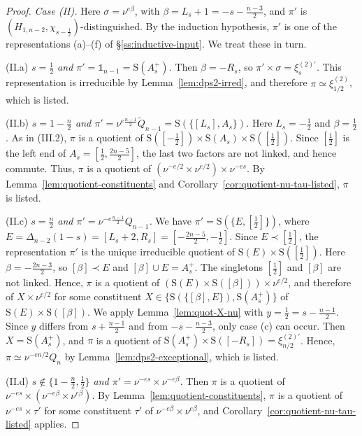\documentclass[11pt]{amsart}
\numberwithin{equation}{section}
\theoremstyle{plain}
\theoremstyle{definition}
\theoremstyle{remark}
\newcommand{\one}{\mathds{1}}
\newcommand{\Qt}{\widetilde{Q}}
\newcommand{\xitwo}{\xi^{(2)}}
\newcommand{\Ss}{\mathrm{S}}
\begin{document}
\begin{proof}
	\emph{Case \textup{(II)}.} Here $\sigma=\nu^{e\beta}$, with $\beta=L_s+1=-s-\frac{n-3}2$, and $\pi'$ is $(H_{1,n-2},\chi_{s-\frac12})$-distinguished. By the induction hypothesis, $\pi'$ is one of the representations (a)--(f) of \S\ref{ss:inductive-input}. We treat these in turn.
	
	(II.a) \emph{$s=\frac12$ and $\pi'=\one_{n-1}=\Ss(A_s^+)$.} Then $\beta=-R_s$, so $\pi'\times\sigma=\xi^{(2)\prime}_s$. This representation is irreducible by Lemma~\ref{lem:dps2-irred}, and therefore $\pi\simeq\xitwo_{1/2}$, which is listed.
	
	(II.b) \emph{$s=1-\frac n2$ and $\pi'=\nu^{e\frac{n-1}2}\Qt_{n-1}=\Ss(\{[L_s],A_s\})$.} Here $L_s=-\frac12$ and $\beta=\frac12$. As in (III.2), $\pi$ is a quotient of $\Ss([-\frac12])\times\Ss(A_s)\times\Ss([\frac12])$. Since $[\frac12]$ is the left end of $A_s=[\frac12,\frac{2n-5}2]$, the last two factors are not linked, and hence commute. Thus, $\pi$ is a quotient of $(\nu^{-e/2}\times\nu^{e/2})\times\nu^{-es}$. By Lemma~\ref{lem:quotient-constituents} and Corollary~\ref{cor:quotient-nu-tau-listed}, $\pi$ is listed.
	
	(II.c) \emph{$s=\frac n2$ and $\pi'=\nu^{-e\frac{n-1}2}Q_{n-1}$.} We have $\pi'=\Ss(\{E,[\frac12]\})$, where $E=\Delta_{n-2}(1-s)=[L_s+2,R_s]=[-\frac{2n-5}2,-\frac12]$. Since $E\prec[\frac12]$, the representation $\pi'$ is the unique irreducible quotient of $\Ss(E)\times\Ss([\frac12])$. Here $\beta=-\frac{2n-3}2$, so $[\beta]\prec E$ and $[\beta]\cup E=A_s^+$. The singletons $[\frac12]$ and $[\beta]$ are not linked. Hence, $\pi$ is a quotient of $(\Ss(E)\times\Ss([\beta]))\times\nu^{e/2}$, and therefore of $X\times\nu^{e/2}$ for some constituent $X\in\{\Ss(\{[\beta],E\}),\Ss(A_s^+)\}$ of $\Ss(E)\times\Ss([\beta])$. We apply Lemma~\ref{lem:quot-X-nu} with $y=\frac12=s-\frac{n-1}2$. Since $y$ differs from $s+\frac{n-1}2$ and from $-s-\frac{n-3}2$, only case (c) can occur. Then $X=\Ss(A_s^+)$, and $\pi$ is a quotient of $\Ss(A_s^+)\times\Ss([-R_s])=\xi^{(2)\prime}_{n/2}$. Hence, $\pi\simeq\nu^{-en/2}Q_n$ by Lemma~\ref{lem:dps2-exceptional}, which is listed.
	
	(II.d) \emph{$s\notin\{1-\frac n2,\frac12\}$ and $\pi'=\nu^{-es}\times\nu^{-e\beta}$.} Then $\pi$ is a quotient of $\nu^{-es}\times(\nu^{-e\beta}\times\nu^{e\beta})$. By Lemma~\ref{lem:quotient-constituents}, $\pi$ is a quotient of $\nu^{-es}\times\tau'$ for some constituent $\tau'$ of $\nu^{-e\beta}\times\nu^{e\beta}$, and Corollary~\ref{cor:quotient-nu-tau-listed} applies.
	

\end{proof}
\end{document}
